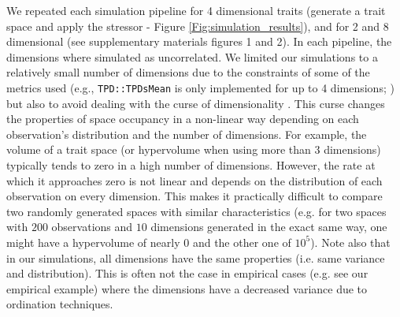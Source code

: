 \documentclass[12pt,letterpaper]{article}
\begin{document}
We repeated each simulation pipeline for 4 dimensional traits (generate a trait space and apply the stressor - Figure \ref{Fig:simulation_results}), and for 2 and 8 dimensional (see supplementary materials figures 1 and 2).
In each pipeline, the dimensions where simulated as uncorrelated.
We limited our simulations to a relatively small number of dimensions due to the constraints of some of the metrics used (e.g., \texttt{TPD::TPDsMean} is only implemented for up to 4 dimensions; \citealt{carmona2019trait}) but also to avoid dealing with the curse of dimensionality \citep{bellman1957dynamic}.
This curse changes the properties of space occupancy in a non-linear way depending on each observation's distribution and the number of dimensions.
For example, the volume of a trait space (or hypervolume when using more than 3 dimensions) typically tends to zero in a high number of dimensions.
However, the rate at which it approaches zero is not linear and depends on the distribution of each observation on every dimension.
This makes it practically difficult to compare two randomly generated spaces with similar characteristics (e.g. for two spaces with $200$ observations and $10$ dimensions generated in the exact same way, one might have a hypervolume of nearly $0$ and the other one of $10^5$).
Note also that in our simulations, all dimensions have the same properties (i.e. same variance and distribution).
This is often not the case in empirical cases (e.g. see our empirical example) where the dimensions have a decreased variance due to ordination techniques.
 
\end{document}
